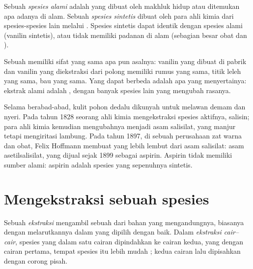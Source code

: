 \begin{definition}\label{def:g10:chemical-species:natural}
Sebuah \emph{spesies alami} adalah 
yang dibuat oleh makhluk hidup atau ditemukan apa adanya di alam. Sebuah
\emph{spesies sintetis} dibuat oleh para ahli
kimia dari spesies-spesies lain melalui . Spesies sintetis
dapat identik dengan spesies alami (vanilin sintetis), atau tidak
memiliki padanan di alam (sebagian besar obat dan ).
\end{definition}

\begin{proposition}\label{prop:g10:chemical-species:same}
Sebuah  memiliki sifat yang sama apa pun asalnya: vanilin
yang dibuat di pabrik dan vanilin yang diekstraksi dari polong memiliki
rumus yang sama, titik leleh yang sama, bau yang sama. Yang dapat
berbeda adalah apa yang menyertainya: ekstrak alami adalah ,
dengan banyak spesies lain yang mengubah rasanya.
\end{proposition}

\begin{history}
Selama berabad-abad, kulit pohon dedalu dikunyah untuk melawan demam dan
nyeri. Pada tahun 1828 seorang ahli kimia mengekstraksi spesies aktifnya,
salisin; para ahli kimia kemudian mengubahnya menjadi asam salisilat,
yang manjur tetapi mengiritasi lambung. Pada tahun 1897, di sebuah
perusahaan zat warna dan obat, Felix Hoffmann membuat 
yang lebih lembut dari asam salisilat: asam asetilsalisilat, yang dijual
sejak 1899 sebagai aspirin. Aspirin tidak memiliki sumber alami: aspirin
adalah spesies yang sepenuhnya sintetis.
\end{history}

\section{Mengekstraksi sebuah spesies}

\begin{definition}\label{def:g10:chemical-species:extraction}
Sebuah \emph{ekstraksi} mengambil sebuah 
dari bahan yang mengandungnya, biasanya dengan melarutkannya dalam
 yang dipilih dengan baik. Dalam
\emph{ekstraksi cair--cair}, spesies yang
 dalam satu cairan dipindahkan ke cairan kedua, yang  dengan cairan pertama, tempat spesies itu lebih mudah ;
kedua cairan lalu dipisahkan dengan corong pisah.
\end{definition}

